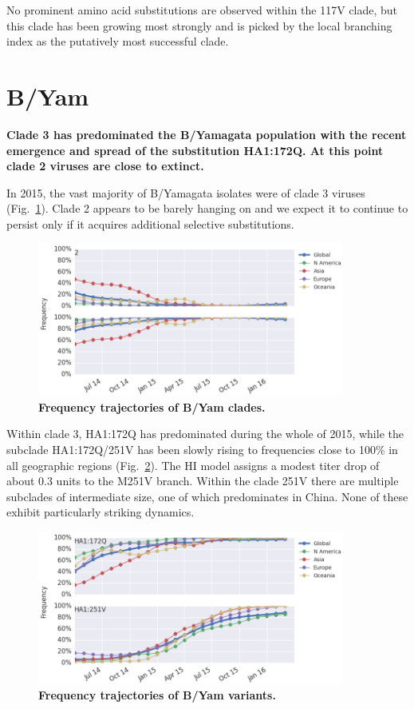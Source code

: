 \documentclass[11pt,oneside,letterpaper]{article}
\begin{document}
No prominent amino acid substitutions are observed within the 117V clade, but this clade has been growing most strongly and is picked by the local branching index \cite{neher2014predicting} as the putatively most successful clade.

\clearpage
\pagebreak

\section*{B/Yam}

\textbf{Clade 3 has predominated the B/Yamagata population with the recent emergence and spread of the substitution HA1:172Q. At this point clade 2 viruses are close to extinct.}

In 2015, the vast majority of B/Yamagata isolates were of clade 3 viruses (Fig.\ \ref{Yam_clades}). Clade 2 appears to be barely hanging on and we expect it to continue to persist only if it acquires additional selective substitutions.

\begin{figure}[h!]
	\centering		
	\includegraphics[width=0.9\textwidth]{../figures/feb-2016/Yam_clades.png}
	\caption{\textbf{Frequency trajectories of B/Yam clades.} 
	}
	\label{Yam_clades}
\end{figure}

\pagebreak

Within clade 3, HA1:172Q has predominated during the whole of 2015, while the subclade HA1:172Q/251V has been slowly rising to frequencies close to 100\% in all geographic regions (Fig.\ \ref{Yam_mutations}). The HI model \cite{neher2015prediction} assigns a modest titer drop of about 0.3 units to the M251V branch. Within the clade 251V there are multiple subclades of intermediate size, one of which predominates in China. None of these exhibit particularly striking dynamics.

\begin{figure}[h!]
	\centering		
	\includegraphics[width=0.9\textwidth]{../figures/feb-2016/Yam_mutations.png}
	\caption{\textbf{Frequency trajectories of B/Yam variants.} 
	}
	\label{Yam_mutations}
\end{figure}



\end{document}
